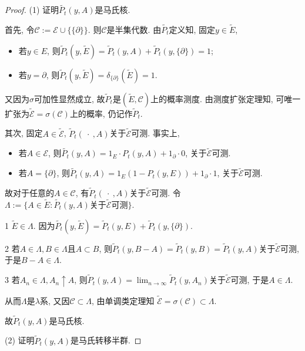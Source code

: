 \documentclass[UTF8,ondside]{ctexart}
\newcommand{\h}{\mathscr}
\newcommand{\circlenumber}[1]{{\small\textcircled{\tiny{#1}}}}
\numberwithin{equation}{section}
\begin{document}
	\begin{proof}
		(1) 证明$\tilde{P_t}(y,A)$是马氏核. 

		首先, 令$\h C:=\h E\cup \{\{\partial\}\}$. 则$\h C$是半集代数. 由$\tilde{P_t}$定义知, 固定$y\in \tilde E$, 
		\begin{itemize}
			\item 若$y\in E$, 则$\tilde P_t(y,\tilde E)=\tilde P_t(y,A)+\tilde P_t(y,\{\partial\})=1$;
			\item 若$y = \partial$, 则$\tilde P_t(y,\tilde E)=\delta_{\{\partial\}}(\tilde E)=1$.
		\end{itemize}
		又因为$\sigma$可加性显然成立, 故$\tilde P_t$是$(\tilde E,\h C)$上的概率测度. 由测度扩张定理知, 可唯一扩张为$\tilde{\h E}=\sigma(\h C)$上的概率, 仍记作$\tilde P_t$.

		其次, 固定$A\in \tilde{\h E}$, $\tilde P_t(\ \cdot\ ,A)$关于$\tilde{\h E}$可测. 事实上,
		\begin{itemize}
			\item 若$A\in\h E$, 则$\tilde{P_t}(y,A)=1_E\cdot P_t(y,A)+1_{\partial}\cdot 0$, 关于$\tilde{\h E}$可测.
			\item 若$A=\{\partial\}$, 则$\tilde{P_t}(y,A)=1_E(1-P_t(y,E))+1_{\partial}\cdot 1$, 关于$\tilde{\h E}$可测.
		\end{itemize}
		故对于任意的$A\in\h C$, 有$\tilde P_t(\ \cdot\ ,A)$关于$\tilde{\h E}$可测. 令$\Lambda:=\{A\in\tilde E:\tilde{P_t}(y,A)\text{关于$\tilde{\h E}$可测}\}$. 
		
		\circlenumber{1} $\tilde E\in\Lambda$. 因为$\tilde{P_t}(y,\tilde E)=\tilde P_t(y,E)+\tilde P_t(y,\{\partial\})$.

		\circlenumber{2} 若$A\in \Lambda, B\in \Lambda$且$A\subset B$, 则$\tilde P_t(y,B-A)=\tilde P_t(y,B)=\tilde P_t(y,A)$关于$\tilde{\h E}$可测, 于是$B-A\in\Lambda$.

		\circlenumber{3} 若$A_n\in\Lambda, A_n\uparrow A$, 则$\tilde P_t(y,A)=\lim_{n\rightarrow\infty}\tilde P_t(y,A_n)$关于$\tilde{\h E}$可测, 于是$A\in\Lambda$.
		
		{\noindent 从而$\Lambda$是$\lambda$系, 又因$\h C\subset\Lambda$, 由单调类定理知 $\tilde{\h E}=\sigma(\h C)\subset \Lambda$. }
		
		故$\tilde P_t(y,A)$是马氏核.

		(2) 证明$\tilde P_t(y,A)$是马氏转移半群.


\end{proof}
\end{document}
